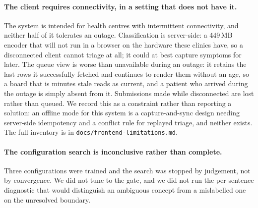 \paragraph{The client requires connectivity, in a setting that does not have
it.} The system is intended for health centres with intermittent connectivity,
and neither half of it tolerates an outage. Classification is server-side: a
449\,MB encoder that will not run in a browser on the hardware these clinics
have, so a disconnected client cannot triage at all; it could at best capture
symptoms for later. The queue view is worse than unavailable during an outage:
it retains the last rows it successfully fetched and continues to render them
without an age, so a board that is minutes stale reads as current, and a patient
who arrived during the outage is simply absent from it. Submissions made while
disconnected are lost rather than queued. We record this as a constraint rather
than reporting a solution: an offline mode for this system is a capture-and-sync
design needing server-side idempotency and a conflict rule for replayed triage,
and neither exists. The full inventory is in \texttt{docs/frontend-limitations.md}.

\paragraph{The configuration search is inconclusive rather than complete.}
Three configurations were trained and the search was stopped by judgement, not
by convergence. We did not tune to the gate, and we did not run the
per-sentence diagnostic that would distinguish an ambiguous concept from a
mislabelled one on the unresolved boundary.


